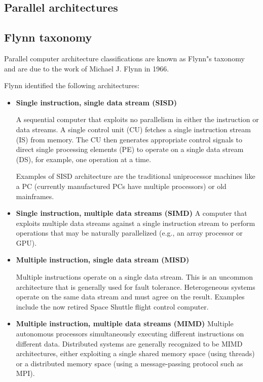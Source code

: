 \documentclass[justified, sixbynine]{tufte-book}
\theoremstyle{plain}%
\newtheorem * {corollary}{Corollary}
\theoremstyle{definition}
\theoremstyle{remark}
\newtheorem * {remark}{Remark}
\newtheorem * {note}{Note}
\begin{document}
\begin{fullwidth}
\section{Parallel architectures}

\goodbreak\subsection{Flynn taxonomy}



Parallel computer architecture classifications are known as Flynn"s taxonomy~\cite{flynn} and are due to the work of Michael J. Flynn in 1966.

Flynn identified the following architectures:

\begin{itemize}
\item {\bf Single instruction, single data stream (SISD)}

A sequential computer that exploits no parallelism in either the instruction or data streams. A single control unit (CU) fetches a single instruction stream (IS) from memory. The CU then generates appropriate control signals to direct single processing elements (PE) to operate on a single data stream (DS), for example, one operation at a time.

Examples of SISD architecture are the traditional uniprocessor machines like a PC (currently manufactured PCs have multiple processors) or old mainframes.

\item {\bf Single instruction, multiple data streams (SIMD)}
A  computer  that   exploits   multiple  data   streams   against  a  single instruction stream  to perform operations that  may be naturally parallelized (e.g., an array processor or GPU).

\item {\bf Multiple instruction, single data stream (MISD)}

Multiple instructions operate on a single data stream. This is an uncommon architecture that is generally used for fault tolerance. Heterogeneous systems operate on the same data stream and must agree on the result. Examples include the now retired Space Shuttle flight control computer.

\item {\bf Multiple instruction, multiple data streams (MIMD)}
Multiple autonomous processors simultaneously executing different instructions on different data. Distributed systems are generally recognized to be MIMD architectures, either exploiting a single shared memory space (using threads) or a distributed memory space (using a message-passing protocol such as MPI).
\end{itemize}


\end{fullwidth}
\end{document}

